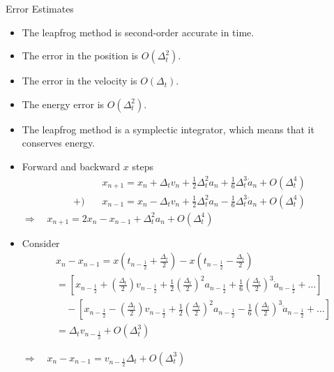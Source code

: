 \documentclass{beamer}
\newcommand{\beforeverb}{\footnotesize}
\newcommand{\afterverb}{\normalsize}
\begin{document}
\begin{frame}{Error Estimates}
  \begin{itemize}
    \item The leapfrog method is second-order accurate in time.
    \item The error in the position is $O(\Delta_t^2)$.
    \item The error in the velocity is $O(\Delta_t)$.
    \item The energy error is $O(\Delta_t^2)$.
    \item The leapfrog method is a symplectic integrator, which means that it conserves energy.
    
  \end{itemize}
\end{frame}
\begin{frame}
  \begin{itemize}
    \item Forward and backward $x$ steps 
    \beforeverb
    \begin{align*} 
      & x_{n+1}=x_n+\Delta_t v_n+\frac{1}{2} \Delta_t^2 a_n+\frac{1}{6} 
      \Delta_t^3 \dot{a}_n+O\left(\Delta_t^4\right) \\ 
     +) \quad & x_{n-1}=x_n-\Delta_t v_n+\frac{1}{2} \Delta_t^2 a_n-\frac{1}{6} 
      \Delta_t^3 \dot{a}_n+O\left(\Delta_t^4\right)  
    \end{align*}
    \afterverb
    $\Rightarrow\quad   x_{n+1}=2 x_n-x_{n-1}+\Delta_t^2 a_n+O\left(\Delta_t^4\right)$
    \item Consider
    \beforeverb
    \begin{align*}
     & x_n-x_{n-1}=x\left(t_{n-\frac{1}{2}}+\frac{\Delta_t}{2}\right)-x\left(t_{n-\frac{1}{2}}-\frac{\Delta_t}{2}\right) \\
      &= \left[x_{n-\frac{1}{2}}+\left(\frac{\Delta_t}{2}\right) v_{n-\frac{1}{2}}+\frac{1}{2}\left(\frac{\Delta_t}{2}\right)^2 a_{n-\frac{1}{2}}+\frac{1}{6}\left(\frac{\Delta_t}{2}\right)^3 \dot{a}_{n-\frac{1}{2}}+\ldots\right]  \\
      & \quad-\left[x_{n-\frac{1}{2}}-\left(\frac{\Delta_t}{2}\right) v_{n-\frac{1}{2}}+\frac{1}{2}\left(\frac{\Delta_t}{2}\right)^2 a_{n-\frac{1}{2}}-\frac{1}{6}\left(\frac{\Delta_t}{2}\right)^3 \dot{a}_{n-\frac{1}{2}}+\ldots\right] \\
      &= \Delta_t v_{n-\frac{1}{2}}+O\left(\Delta_t^3\right) 
      \end{align*}
   \afterverb
   
   $ \Rightarrow \quad x_n-x_{n-1}=v_{n-\frac{1}{2}} \Delta_t+O\left(\Delta_t^3\right)$ 
    \end{itemize}
\end{frame}
\end{document}
